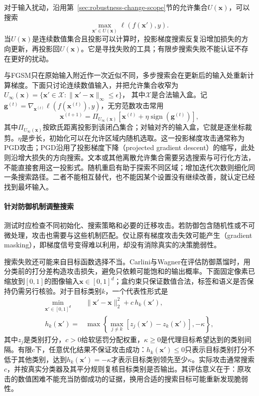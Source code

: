 对于输入扰动，沿用第~\ref{sec:robustness-change-scope}节的允许集合$U(\bm x)$，可以搜索
\[
 \max_{\bm{x}'\in U(\bm x)}\ell(f(\bm{x}'),y).
\]
当$U(\bm x)$是连续数值集合且投影可以计算时，投影梯度搜索反复沿增加损失的方向更新，再投影回$U(\bm x)$。它是寻找失败的工具；有限步搜索失败不能认证不存在更好的扰动。

与FGSM只在原始输入附近作一次近似不同，多步搜索会在更新后的输入处重新计算梯度。下面只讨论连续数值输入，并把允许集合收窄为
$U_\infty(\bm{x})=\{\bm{x}'\in\mathcal X:\lVert\bm{x}'-\bm{x}\rVert_\infty\leq\epsilon\}$，
其中$\mathcal X$是合法输入盒。记$\bm{g}^{(t)}=\nabla_{\bm{x}^{(t)}}\ell(f(\bm{x}^{(t)}),y)$，无穷范数攻击常用
\begin{equation}
 \bm{x}^{(t+1)}
 =\Pi_{U_\infty(\bm{x})}
 \left[
 \bm{x}^{(t)}
 +\eta\operatorname{sign}(\bm{g}^{(t)})
 \right],
 \label{eq:security-pgd}
\end{equation}
其中$\Pi_{U_\infty(\bm{x})}$按欧氏距离投影到该闭凸集合；对轴对齐的输入盒，它就是逐坐标裁剪。$\eta$是步长，初始化可以在允许区域内随机选取。这一投影梯度攻击通常称为PGD攻击；PGD沿用了投影梯度下降（projected gradient descent）的缩写，此处则沿增大损失的方向搜索。文本或其他离散允许集合需要另选搜索与可行化方法，不能直接套用这一投影式。随机重启有助于探索不同区域；增加迭代次数则细化同一条搜索路径。二者不能相互替代，也不能因某个设置没有继续改善，就认定已经找到最坏输入。

\paragraph{针对防御机制调整搜索}

测试时应检查不同初始化、搜索策略和必要的迁移攻击。若防御包含随机性或不可微处理，攻击也需要与这些机制匹配。仅让原有梯度攻击失效可能产生（gradient masking），即梯度信号变得难以利用，却没有消除真实的决策脆弱性。

搜索失败还可能来自目标函数选择不当。Carlini与Wagner在评估防御蒸馏时，用分类前的打分差构造攻击损失，避免只依赖可能饱和的输出概率。下面固定像素已缩放到$[0,1]$的图像输入$\bm{x}\in[0,1]^d$；盒约束只保证数值合法，标签和语义是否保持仍需另行核验。对于目标类别$k$，一个代表性形式是
\begin{equation}
 \begin{aligned}
 \min_{\bm{x}'\in[0,1]^d}\quad&
 \|\bm{x}'-\bm{x}\|_2^2+c\,h_k(\bm{x}'),\\
 h_k(\bm{x}')={}&
 \max\left\{\max_{j\ne k}
 [z_j(\bm{x}')-z_k(\bm{x}')],-\kappa\right\},
 \end{aligned}
 \label{eq:security-cw}
\end{equation}
其中$z_j$是类别打分，$c>0$给软惩罚分配权重，$\kappa\geq0$是代理目标希望达到的类别间隔。有限$c$下，任意优化结果不保证攻击成功：$h_k(\bm{x}')\leq0$只表示目标类别打分不低于其他类别，达到$h_k(\bm{x}')=-\kappa$才表示目标类别领先至少$\kappa$。实际攻击通常搜索$c$，并按真实分类器及其平分规则复核目标类别是否输出。其评估意义在于：原攻击的数值困难不能充当防御成功的证据，换用合适的搜索目标可能重新发现脆弱性。

